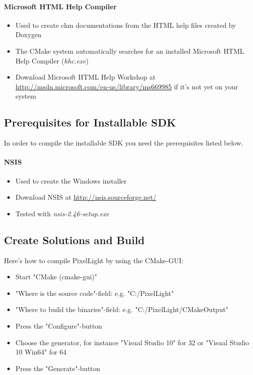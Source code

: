 \paragraph{Microsoft \ac{HTML} Help Compiler}
\begin{itemize}
\item{Used to create chm documentations from the \ac{HTML} help files created by Doxygen}
\item{The CMake system automatically searches for an installed Microsoft \ac{HTML} Help Compiler (\emph{hhc.exe})}
\item{Download Microsoft \ac{HTML} Help Workshop at \url{http://msdn.microsoft.com/en-us/library/ms669985} if it's not yet on your system}
\end{itemize}



\subsection{Prerequisites for Installable \ac{SDK}}
In order to compile the installable \ac{SDK} you need the prerequisites listed below.


\paragraph{\ac{NSIS}}
\begin{itemize}
\item{Used to create the Windows installer}
\item{Download \ac{NSIS} at \url{http://nsis.sourceforge.net/}}
\item{Tested with \emph{nsis-2.46-setup.exe}}
\end{itemize}




\subsection{Create Solutions and Build}
Here's how to compile PixelLight by using the CMake-\ac{GUI}:
\begin{itemize}
\item{Start "CMake (cmake-gui)"}
\item{"Where is the source code"-field: e.g. "C:/PixelLight"}
\item{"Where to build the binaries"-field: e.g. "C:/PixelLight/CMakeOutput"}
\item{Press the "Configure"-button}
\item{Choose the generator, for instance "Visual Studio 10" for \SI{32}{\bit} or "Visual Studio 10 Win64" for \SI{64}{\bit}}
\item{Press the "Generate"-button}
\end{itemize}

